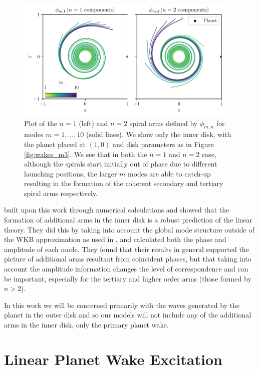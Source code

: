 \begin{figure}
    \centering
    \includegraphics[width = 0.95\textwidth]{figures/inner_n_1_and_2.pdf}
    \caption{Plot of the $n=1$ (left) and $n=2$ spiral arms defined by $\phi_{m,n}$ for modes $m=1,...,10$ (solid lines).
    We show only the inner disk, with the planet placed at $(1,0)$ and disk parameters as in Figure \ref{fig:wakes_m3}.
    We see that in both the $n=1$ and $n=2$ case, although the spirals start initially out of phase due to different launching positions, the larger $m$ modes are able to catch-up resulting in the formation of the coherent secondary and tertiary spiral arms respectively.}
    \label{fig:additional_arms}
\end{figure}

\citet{miranda2019a} built upon this work through numerical calculations and showed that the formation of additional arms in the inner disk is a robust prediction of the linear theory.
They did this by taking into account the global mode structure outside of the WKB approximation as used in \citet{bae2018a}, and calculated both the phase and amplitude of each mode.
They found that their results in general supported the picture of additional arms resultant from coincident phases, but that taking into account the amplitude information changes the level of correspondence and can be important, especially for the tertiary and higher order arms (those formed by $n>2$).

In this work we will be concerned primarily with the waves generated by the planet in the outer disk and so our models will not include any of the additional arms in the inner disk, only the primary planet wake.

\section{Linear Planet Wake Excitation} \label{sec:linear_wake_excitation}

